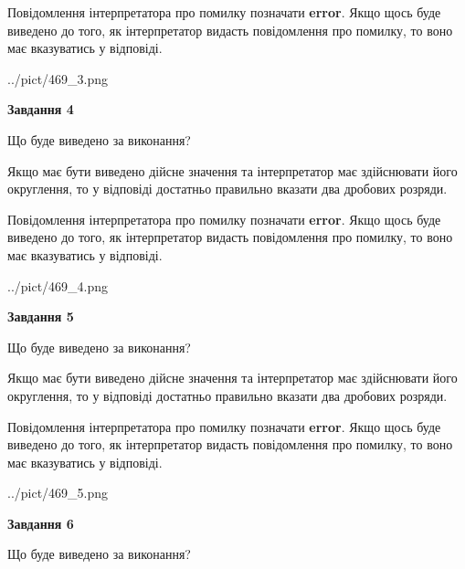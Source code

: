 \documentclass[12pt, ukrainian]{article}
\begin{document}
{\begin {Large}
Повідомлення інтерпретатора про помилку позначати \textbf{error}.
Якщо щось буде виведено до того, як інтерпретатор видасть повідомлення про помилку, 
то воно має вказуватись у відповіді. \par

\begin{center}
	{../pict/469_3.png}
\end{center}
\newpage

{\begin {center}\textbf{Завдання 4}\end {center}}\par
Що буде виведено за виконання? \par

Якщо має бути виведено дійсне значення та інтерпретатор має здійснювати його округлення, 
то у відповіді достатньо правильно вказати два дробових розряди.

Повідомлення інтерпретатора про помилку позначати \textbf{error}.
Якщо щось буде виведено до того, як інтерпретатор видасть повідомлення про помилку, 
то воно має вказуватись у відповіді. \par

\begin{center}
	{../pict/469_4.png}
\end{center}
\newpage

{\begin {center}\textbf{Завдання 5}\end {center}}\par
Що буде виведено за виконання? \par

Якщо має бути виведено дійсне значення та інтерпретатор має здійснювати його округлення, 
то у відповіді достатньо правильно вказати два дробових розряди.

Повідомлення інтерпретатора про помилку позначати \textbf{error}.
Якщо щось буде виведено до того, як інтерпретатор видасть повідомлення про помилку, 
то воно має вказуватись у відповіді. \par

\begin{center}
	{../pict/469_5.png}
\end{center}
\newpage

{\begin {center}\textbf{Завдання 6}\end {center}}\par
Що буде виведено за виконання? \par


\end{Large}}
\end{document}
